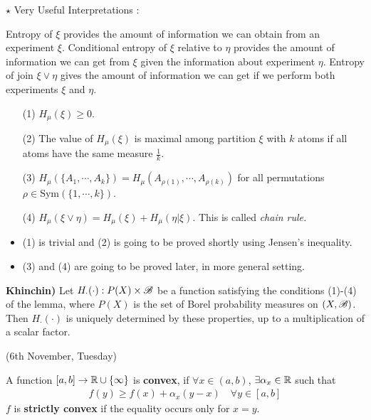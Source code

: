 \documentclass[12pt,a4paper]{report}
\newenvironment{proof}
{\begin{changemargin}{1cm}{0.5cm} 
	}%
	{\end{changemargin}
}
\begin{document}
$\star$ Very Useful Interpretations : 

\quad Entropy of $\xi$ provides the amount of information we can obtain from an experiment $\xi$. Conditional entropy of $\xi$ relative to $\eta$ provides the amount of information we can get from $\xi$ given the information about experiment $\eta$. Entropy of join $\xi \vee \eta$ gives the amount of information we can get if we perform both experiments $\xi$ and $\eta$.
\s

\lem
\begin{itemize}
\item[(1)] $H_{\mu} (\xi) \geq 0$.
\item[(2)] The value of $H_{\mu}(\xi)$ is maximal among partition $\xi$ with $k$ atoms if all atoms have the same measure $\frac{1}{k}$.
\item[(3)] $H_{\mu}(\{A_1, \cdots, A_k \}) = H_{\mu}(A_{\rho (1)}, \cdots, A_{\rho (k)})$ for all permutations $\rho \in \text{Sym}(\{1,\cdots,k\})$.
\item[(4)] $H_{\mu} (\xi \vee \eta) = H_{\mu}(\xi) + H_{\mu}(\eta |\xi)$. This is called \emph{chain rule.}
\end{itemize}
\begin{proof}
\pf \begin{itemize}
\item (1) is trivial and (2) is going to be proved shortly using Jensen's inequality.
\item (3) and (4) are going to be proved later, in more general setting.
\end{itemize}
\end{proof}
\s

\textbf{Khinchin)} Let $H_{\cdot}(\cdot) : P(X) \times \mathscr{B}$ be a function satisfying the conditions (1)-(4) of the lemma, where $P(X)$ is the set of Borel probability measures on $(X,\mathscr{B})$. Then $H_{\cdot}(\cdot)$ is uniquely determined by these properties, up to a multiplication of a scalar factor.
\s

\newday
\s

(6th November, Tuesday)

 A function $[a,b] \rightarrow \mathbb{R} \cup \{ \infty \}$ is \textbf{convex}, if $\forall x \in (a,b)$, $\exists \alpha_x \in \mathbb{R}$ such that
\begin{align*}
f(y) \geq f(x) + \alpha_x (y-x) \quad \forall y \in [a,b]
\end{align*}
$f$ is \textbf{strictly convex} if the equality occurs only for $x=y$. 
\s
\end{document}
